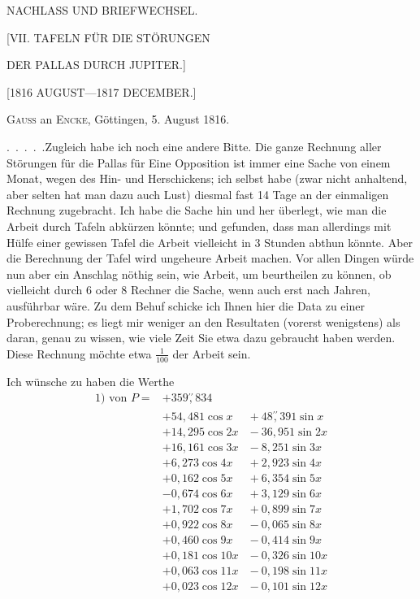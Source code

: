 \begingroup
{}
\clearpage
{}
\begin{center}
\large NACHLASS UND BRIEFWECHSEL.
\par\bigskip
\Large [VII. TAFELN FÜR DIE STÖRUNGEN\par DER PALLAS DURCH JUPITER.]
\par\medskip
\normalsize [1816 AUGUST---1817 DECEMBER.]
\par\bigskip
[1.]
\par\medskip
\textsc{Gauss} an \textsc{Encke}, Göttingen, 5. August 1816.
\end{center}
\par\noindent\hspace*{\parindent}.\ .\ .\ .\ .\quad Zugleich habe ich noch eine andere Bitte. Die ganze Rechnung
aller Störungen für die Pallas für Eine Opposition ist immer eine Sache von
einem Monat, wegen des Hin- und Herschickens; ich selbst habe (zwar nicht
anhaltend, aber selten hat man dazu auch Lust) diesmal fast 14 Tage an der
einmaligen Rechnung zugebracht. Ich habe die Sache hin und her überlegt,
wie man die Arbeit durch Tafeln abkürzen könnte; und gefunden, dass man
allerdings mit Hülfe einer gewissen Tafel die Arbeit vielleicht in 3 Stunden
abthun könnte. Aber die Berechnung der Tafel wird ungeheure Arbeit
machen. Vor allen Dingen würde nun aber ein Anschlag nöthig sein, wie
 Arbeit, um beurtheilen zu können, ob vielleicht durch 6 oder 8 Rechner
die Sache, wenn auch erst nach Jahren, ausführbar wäre. Zu dem Behuf
schicke ich Ihnen hier die Data zu einer Proberechnung; es liegt mir weniger
an den Resultaten (vorerst wenigstens) als daran, genau zu wissen, wie
viele Zeit Sie etwa dazu gebraucht haben werden. Diese Rechnung möchte
etwa \(\tfrac{1}{100}\) der  Arbeit sein.
\par\noindent\hspace*{\parindent}Ich wünsche zu haben die Werthe
\[
\begin{aligned}
\text{1) von }P={}&+359\overset{\prime\prime}{,}834\\
&+54{,}481\cos x &{}+48\overset{\prime\prime}{,}391\sin x\\
&+14{,}295\cos2x &{}-36{,}951\sin2x\\
&+16{,}161\cos3x &{}-8{,}251\sin3x\\
&+6{,}273\cos4x &{}+2{,}923\sin4x\\
&+0{,}162\cos5x &{}+6{,}354\sin5x\\
&-0{,}674\cos6x &{}+3{,}129\sin6x\\
&+1{,}702\cos7x &{}+0{,}899\sin7x\\
&+0{,}922\cos8x &{}-0{,}065\sin8x\\
&+0{,}460\cos9x &{}-0{,}414\sin9x\\
&+0{,}181\cos10x &{}-0{,}326\sin10x\\
&+0{,}063\cos11x &{}-0{,}198\sin11x\\
&+0{,}023\cos12x &{}-0{,}101\sin12x
\end{aligned}
\]
